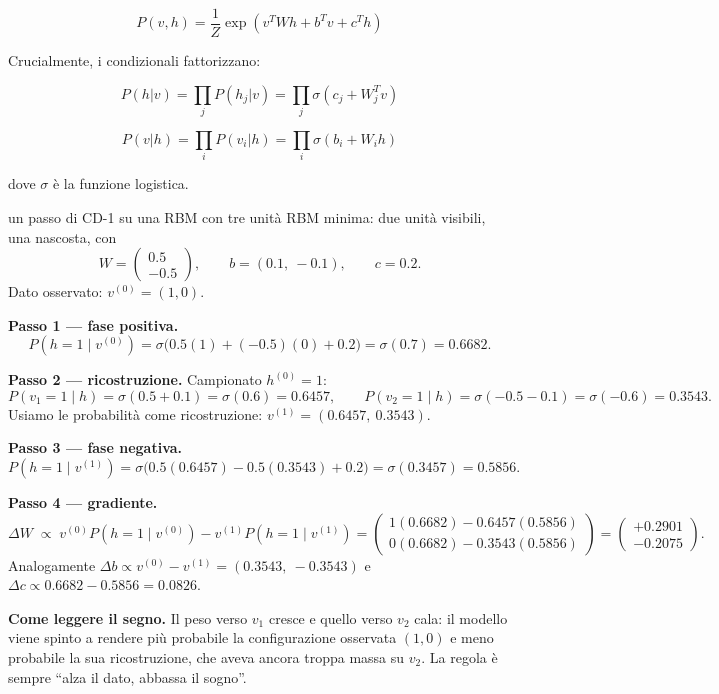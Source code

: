 \begin{definition}
  \[P(v,h) = \frac{1}{Z} \exp(v^T W h + b^T v + c^T h)\]
\end{definition}

Crucialmente, i condizionali fattorizzano:

\[P(h|v) = \prod_j P(h_j|v) = \prod_j \sigma(c_j + W_j^T v)\]

\[P(v|h) = \prod_i P(v_i|h) = \prod_i \sigma(b_i + W_i h)\]

dove $\sigma$ è la funzione logistica.

\begin{esempiosvolto}{un passo di CD-1 su una RBM con tre unità}
RBM minima: due unità visibili, una nascosta, con
\[
W = \begin{pmatrix} 0.5 \\ -0.5 \end{pmatrix}, \qquad b = (0.1,\ -0.1), \qquad c = 0.2.
\]
Dato osservato: $v^{(0)} = (1, 0)$.

\medskip
\textbf{Passo 1 — fase positiva.}
\[
P(h{=}1 \mid v^{(0)}) = \sigma\big(0.5(1) + (-0.5)(0) + 0.2\big) = \sigma(0.7) = 0.6682.
\]

\medskip
\textbf{Passo 2 — ricostruzione.} Campionato $h^{(0)} = 1$:
\[
P(v_1{=}1 \mid h) = \sigma(0.5 + 0.1) = \sigma(0.6) = 0.6457, \qquad
P(v_2{=}1 \mid h) = \sigma(-0.5 - 0.1) = \sigma(-0.6) = 0.3543.
\]
Usiamo le probabilità come ricostruzione: $v^{(1)} = (0.6457,\ 0.3543)$.

\medskip
\textbf{Passo 3 — fase negativa.}
\[
P(h{=}1 \mid v^{(1)}) = \sigma\big(0.5(0.6457) - 0.5(0.3543) + 0.2\big) = \sigma(0.3457) = 0.5856.
\]

\medskip
\textbf{Passo 4 — gradiente.}
\[
\Delta W \;\propto\; v^{(0)} P(h{=}1 \mid v^{(0)}) - v^{(1)} P(h{=}1 \mid v^{(1)})
= \begin{pmatrix} 1(0.6682) - 0.6457(0.5856) \\ 0(0.6682) - 0.3543(0.5856) \end{pmatrix}
= \begin{pmatrix} +0.2901 \\ -0.2075 \end{pmatrix}.
\]
Analogamente $\Delta b \propto v^{(0)} - v^{(1)} = (0.3543,\ -0.3543)$ e $\Delta c \propto 0.6682 - 0.5856 = 0.0826$.

\medskip
\textbf{Come leggere il segno.} Il peso verso $v_1$ cresce e quello verso $v_2$ cala: il modello viene spinto a rendere più probabile la configurazione osservata $(1,0)$ e meno probabile la sua ricostruzione, che aveva ancora troppa massa su $v_2$. La regola è sempre ``alza il dato, abbassa il sogno''.


\end{esempiosvolto}
